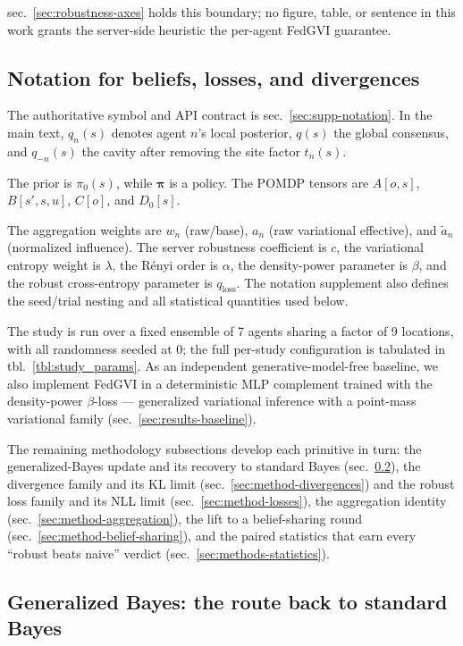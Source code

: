 \documentclass[
  english,
]{article}
\theoremstyle{plain}
\theoremstyle{definition}
\theoremstyle{remark}
\theoremstyle{definition}
\begin{document}
sec.~\ref{sec:robustness-axes} holds this boundary; no figure, table, or
sentence in this work grants the server-side heuristic the per-agent
FedGVI guarantee.

\subsection{Notation for beliefs, losses, and
divergences}\label{sec:method-notation}

The authoritative symbol and API contract is
sec.~\ref{sec:supp-notation}. In the main text, \(q_n(s)\) denotes agent
\(n\)'s local posterior, \(q(s)\) the global consensus, and
\(q_{-n}(s)\) the cavity after removing the site factor \(t_n(s)\).

The prior is \(\pi_0(s)\), while \(\boldsymbol{\pi}\) is a policy. The
POMDP tensors are \(A[o,s]\), \(B[s',s,u]\), \(C[o]\), and \(D_0[s]\).

The aggregation weights are \(w_n\) (raw/base), \(a_n\) (raw variational
effective), and \(\widetilde a_n\) (normalized influence). The server
robustness coefficient is \(c\), the variational entropy weight is
\(\lambda\), the Rényi order is \(\alpha\), the density-power parameter
is \(\beta\), and the robust cross-entropy parameter is
\(q_{\text{loss}}\). The notation supplement also defines the seed/trial
nesting and all statistical quantities used below.

The study is run over a fixed ensemble of 7 agents sharing a factor of 9
locations, with all randomness seeded at 0; the full per-study
configuration is tabulated in tbl.~\ref{tbl:study_params}. As an
independent generative-model-free baseline, we also implement FedGVI in
a deterministic MLP complement trained with the density-power
\(\beta\)-loss --- generalized variational inference with a point-mass
variational family (sec.~\ref{sec:results-baseline}).

The remaining methodology subsections develop each primitive in turn:
the generalized-Bayes update and its recovery to standard Bayes
(sec.~\ref{sec:method-genbayes}), the divergence family and its KL limit
(sec.~\ref{sec:method-divergences}) and the robust loss family and its
NLL limit (sec.~\ref{sec:method-losses}), the aggregation identity
(sec.~\ref{sec:method-aggregation}), the lift to a belief-sharing round
(sec.~\ref{sec:method-belief-sharing}), and the paired statistics that
earn every ``robust beats naive'' verdict
(sec.~\ref{sec:methods-statistics}).

\subsection{Generalized Bayes: the route back to standard
Bayes}\label{sec:method-genbayes}
\end{document}
